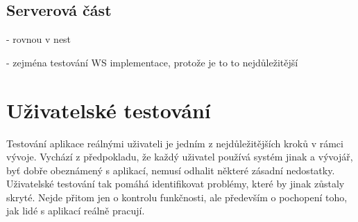 \subsection{Serverová část}

- rovnou v nest

- zejména testování WS implementace, protože je to to nejdůležitější







\section{Uživatelské testování}

Testování aplikace reálnými uživateli je jedním z nejdůležitějších kroků v rámci vývoje. 
Vychází z předpokladu, že každý uživatel používá systém jinak a vývojář, byť dobře obeznámený s aplikací, nemusí odhalit některé zásadní nedostatky. 
Uživatelské testování tak pomáhá identifikovat problémy, které by jinak zůstaly skryté. 
Nejde přitom jen o kontrolu funkčnosti, ale především o pochopení toho, jak lidé s aplikací reálně pracují.

